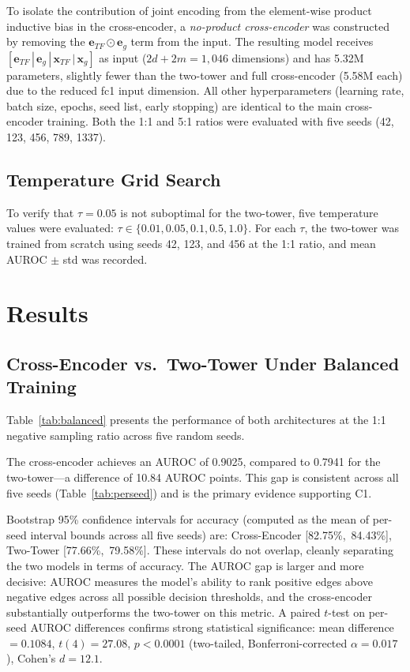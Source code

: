 \documentclass[journal]{IEEEtran}
\begin{document}
To isolate the contribution of joint encoding from the element-wise product
inductive bias in the cross-encoder, a \emph{no-product cross-encoder} was
constructed by removing the $\mathbf{e}_{TF} \odot \mathbf{e}_g$ term from
the input. The resulting model receives
$[\mathbf{e}_{TF} \,|\, \mathbf{e}_g \,|\, \mathbf{x}_{TF} \,|\, \mathbf{x}_g]$
as input ($2d + 2m = 1{,}046$ dimensions) and has 5.32M parameters, slightly
fewer than the two-tower and full cross-encoder (5.58M each) due to the
reduced fc1 input dimension. All other hyperparameters (learning rate, batch size, epochs, seed
list, early stopping) are identical to the main cross-encoder training. Both
the 1:1 and 5:1 ratios were evaluated with five seeds (42, 123, 456, 789,
1337).

\subsection{Temperature Grid Search}
\label{ssec:tempsearch_method}

To verify that $\tau = 0.05$ is not suboptimal for the two-tower, five
temperature values were evaluated: $\tau \in \{0.01, 0.05, 0.1, 0.5, 1.0\}$.
For each $\tau$, the two-tower was trained from scratch using seeds 42, 123,
and 456 at the 1:1 ratio, and mean AUROC $\pm$ std was recorded.

\section{Results}
\label{sec:results}

\subsection{Cross-Encoder vs.\ Two-Tower Under Balanced Training}
\label{ssec:h1}

Table~\ref{tab:balanced} presents the performance of both architectures at the
1:1 negative sampling ratio across five random seeds.

The cross-encoder achieves an AUROC of 0.9025, compared to 0.7941 for the
two-tower---a difference of 10.84 AUROC points. This gap is consistent across
all five seeds (Table~\ref{tab:perseed}) and is the primary evidence supporting
C1.

Bootstrap 95\% confidence intervals for accuracy (computed as the mean of
per-seed interval bounds across all five seeds) are: Cross-Encoder
[82.75\%,~84.43\%], Two-Tower [77.66\%,~79.58\%]. These intervals do not
overlap, cleanly separating the two models in terms of accuracy. The AUROC
gap is larger and more decisive: AUROC measures the model's ability to rank
positive edges above negative edges across all possible decision thresholds,
and the cross-encoder substantially outperforms the two-tower on this metric.
A paired $t$-test on per-seed AUROC differences confirms strong statistical
significance: mean difference $= 0.1084$,
$t(4) = 27.08$, $p < 0.0001$ (two-tailed, Bonferroni-corrected
$\alpha = 0.017$), Cohen's $d = 12.1$.
\end{document}
